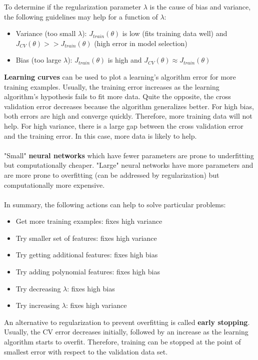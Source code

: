 \documentclass{report}
\begin{document}
To determine if the regularization parameter $\lambda$ is the cause of bias and variance, the following guidelines may help for a function of $\lambda$:
\begin{itemize}
\item Variance (too small $\lambda$): $J_{train}(\theta)$ is low (fits training data well) and $J_{CV}(\theta)>>J_{train}(\theta)$ (high error in model selection)
\item Bias (too large $\lambda$): $J_{train}(\theta)$ is high and $J_{CV}(\theta)\approx J_{train}(\theta)$
\end{itemize}

{\bf Learning curves} can be used to plot a learning's algorithm error for more training examples. Usually, the training error increases as the learning algorithm's hypothesis fails to fit more data. Quite the opposite, the cross validation error decreases because the algorithm generalizes better. For high bias, both errors are high and converge quickly. Therefore, more training data will not help. For high variance, there is a large gap between the cross validation error and the training error. In this case, more data is likely to help.
\\ \\
"Small" {\bf neural networks} which have fewer parameters are prone to underfitting but computationally cheaper. "Large" neural networks have more parameters and are more prone to overfitting (can be addressed by regularization) but computationally more expensive.
\\ \\
In summary, the following actions can help to solve particular problems:
\begin{itemize}
\item Get more training examples: fixes high variance
\item Try smaller set of features: fixes high variance
\item Try getting additional features: fixes high bias
\item Try adding polynomial features: fixes high bias
\item Try decreasing $\lambda$: fixes high bias
\item Try increasing $\lambda$: fixes high variance
\end{itemize}

An alternative to regularization to prevent overfitting is called {\bf early stopping}.
Usually, the CV error decreases initially, followed by an increase as the learning algorithm starts to overfit.
Therefore, training can be stopped at the point of smallest error with respect to the validation data set.
\end{document}
